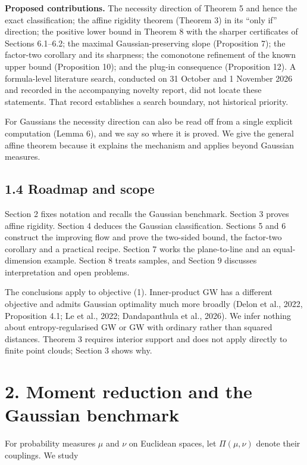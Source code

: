 \documentclass[
  british,
  11pt,
  a4paper,
]{article}
\begin{document}
\textbf{Proposed contributions.} The necessity direction of Theorem 5
and hence the exact classification; the affine rigidity theorem (Theorem
3) in its ``only if'' direction; the positive lower bound in Theorem 8
with the sharper certificates of Sections 6.1--6.2; the maximal
Gaussian-preserving slope (Proposition 7); the factor-two corollary and
its sharpness; the comonotone refinement of the known upper bound
(Proposition 10); and the plug-in consequence (Proposition 12). A
formula-level literature search, conducted on 31 October and 1 November
2026 and recorded in the accompanying novelty report, did not locate
these statements. That record establishes a search boundary, not
historical priority.

For Gaussians the necessity direction can also be read off from a single
explicit computation (Lemma 6), and we say so where it is proved. We
give the general affine theorem because it explains the mechanism and
applies beyond Gaussian measures.

\subsection{1.4 Roadmap and scope}\label{roadmap-and-scope}

Section 2 fixes notation and recalls the Gaussian benchmark. Section 3
proves affine rigidity. Section 4 deduces the Gaussian classification.
Sections 5 and 6 construct the improving flow and prove the two-sided
bound, the factor-two corollary and a practical recipe. Section 7 works
the plane-to-line and an equal-dimension example. Section 8 treats
samples, and Section 9 discusses interpretation and open problems.

The conclusions apply to objective (1). Inner-product GW has a different
objective and admits Gaussian optimality much more broadly (Delon et
al., 2022, Proposition 4.1; Le et al., 2022; Dandapanthula et al.,
2026). We infer nothing about entropy-regularised GW or GW with ordinary
rather than squared distances. Theorem 3 requires interior support and
does not apply directly to finite point clouds; Section 3 shows why.

\section{2. Moment reduction and the Gaussian
benchmark}\label{moment-reduction-and-the-gaussian-benchmark}

For probability measures \(\mu\) and \(\nu\) on Euclidean spaces, let
\(\Pi(\mu,\nu)\) denote their couplings. We study
\end{document}
